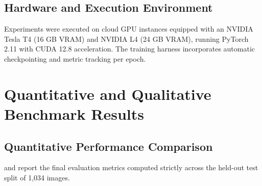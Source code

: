 \documentclass[twoside,final]{hcmut-report}
\begin{document}
\subsection{Hardware and Execution Environment}

Experiments were executed on cloud GPU instances equipped with an NVIDIA Tesla T4 (16 GB VRAM) and NVIDIA L4 (24 GB VRAM), running PyTorch 2.11 with CUDA 12.8 acceleration. The training harness incorporates automatic checkpointing and metric tracking per epoch.




\FloatBarrier

\section{Quantitative and Qualitative Benchmark Results}

\label{sec:results}

\subsection{Quantitative Performance Comparison}

 and  report the final evaluation metrics computed strictly across the held-out test split of 1,034 images.
\end{document}
